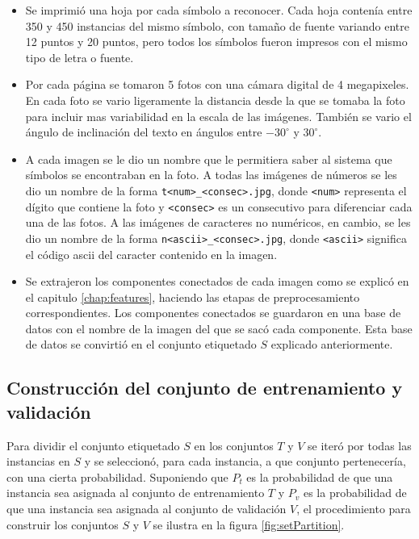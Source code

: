 \documentclass[a4paper, 11pt, oneside]{report}
\begin{document}
\begin{itemize}

	\item Se imprimió una hoja por cada símbolo a reconocer. Cada hoja contenía entre 350 y 450 instancias del mismo símbolo, con tamaño de fuente variando entre 12 puntos y 20 puntos, pero todos los símbolos fueron impresos con el mismo tipo de letra o fuente.

	\item Por cada página se tomaron 5 fotos con una cámara digital de 4 megapixeles. En cada foto se vario ligeramente la distancia desde la que se tomaba la foto para incluir mas variabilidad en la escala de las imágenes. También se vario el ángulo de inclinación del texto en ángulos entre $-30^\circ$ y $30^\circ$.

	\item A cada imagen se le dio un nombre que le permitiera saber al sistema que símbolos se encontraban en la foto. A todas las imágenes de números se les dio un nombre de la forma \verb/t<num>_<consec>.jpg/, donde \verb/<num>/ representa el dígito que contiene la foto y \verb/<consec>/ es un consecutivo para diferenciar cada una de las fotos. A las imágenes de caracteres no numéricos, en cambio, se les dio un nombre de la forma \verb/n<ascii>_<consec>.jpg/, donde \verb/<ascii>/ significa el código ascii del caracter contenido en la imagen.

	\item Se extrajeron los componentes conectados de cada imagen como se explicó en el capitulo \ref{chap:features}, haciendo las etapas de preprocesamiento correspondientes. Los componentes conectados se guardaron en una base de datos con el nombre de la imagen del que se sacó cada componente. Esta base de datos se convirtió en el conjunto etiquetado $S$ explicado anteriormente.

\end{itemize}

\subsection{Construcción del conjunto de entrenamiento y validación}
\label{sect:trainingSet}

Para dividir el conjunto etiquetado $S$ en los conjuntos $T$ y $V$ se iteró por todas las instancias en $S$ y se seleccionó, para cada instancia, a que conjunto pertenecería, con una cierta probabilidad. Suponiendo que $P_t$ es la probabilidad de que una instancia sea asignada al conjunto de entrenamiento $T$ y $P_v$ es la probabilidad de que una instancia sea asignada al conjunto de validación $V$, el procedimiento para construir los conjuntos $S$ y $V$ se ilustra en la figura \ref{fig:setPartition}.
\end{document}
